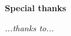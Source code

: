\thispagestyle{empty}

\begin{center}
  {\bf \Huge Special thanks}
\end{center}

\vspace{4cm}


\emph{
  ...thanks to...
}
